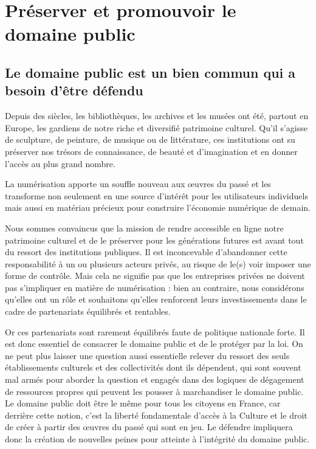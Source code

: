 \chapter{Préserver et promouvoir le domaine public}\label{dompub}

\section{Le domaine public est un bien commun qui a besoin d'être défendu}
Depuis des siècles, les bibliothèques, les archives et les musées ont été, partout en Europe, les
gardiens de notre riche et diversifié patrimoine culturel. Qu’il s’agisse de sculpture, de peinture,
de musique ou de littérature, ces institutions ont su préserver nos trésors de connaissance, de
beauté et d’imagination et en donner l’accès au plus grand nombre.

La numérisation apporte un souffle nouveau aux œuvres du passé et les transforme non
seulement en une source d’intérêt pour les utilisateurs individuels mais aussi en matériau précieux
pour construire l’économie numérique de demain.

Nous sommes convaincus que la mission de rendre accessible en ligne notre patrimoine culturel
et de le préserver pour les générations futures est avant tout du ressort des
institutions publiques. Il est inconcevable d’abandonner cette responsabilité à un ou plusieurs
acteurs privés, au risque de le(s) voir imposer une forme de contrôle. Mais cela ne signifie pas que
les entreprises privées ne doivent pas s’impliquer en matière de numérisation : bien au contraire,
nous considérons qu’elles ont un rôle et souhaitons qu’elles renforcent leurs investissements dans
le cadre de partenariats équilibrés et rentables.

Or ces partenariats sont rarement équilibrés faute de politique nationale forte. Il est donc essentiel de consacrer le domaine public et de le protéger par la loi. On ne peut plus laisser une question aussi essentielle relever du ressort des seuls établissements culturels et des collectivités dont ils dépendent, qui sont souvent mal armés pour aborder la question et engagés dans des logiques de dégagement de ressources propres qui peuvent les pousser à marchandiser le domaine public. Le domaine public doit être le même pour tous les citoyens en France, car derrière cette notion, c’est la liberté fondamentale d’accès à la Culture et le droit de créer à partir des œuvres du passé qui sont en jeu. Le défendre impliquera donc la création de nouvelles peines pour atteinte à l'intégrité du domaine public.


